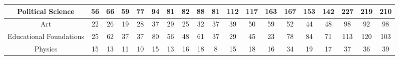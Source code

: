 \documentclass[10]{article}
\begin{document}
\begin{landscape}
\begin{longtable}[c]{|ccccccccccccccccccc|}
	\multicolumn{1}{|c|}{Political Science}                          & \multicolumn{1}{c|}{56}         & \multicolumn{1}{c|}{66}         & \multicolumn{1}{c|}{59}         & \multicolumn{1}{c|}{77}         & \multicolumn{1}{c|}{94}         & \multicolumn{1}{c|}{81}         & \multicolumn{1}{c|}{82}         & \multicolumn{1}{c|}{88}         & \multicolumn{1}{c|}{81}         & \multicolumn{1}{c|}{112}        & \multicolumn{1}{c|}{117}        & \multicolumn{1}{c|}{163}        & \multicolumn{1}{c|}{167}        & \multicolumn{1}{c|}{153}        & \multicolumn{1}{c|}{142}        & \multicolumn{1}{c|}{227}        & \multicolumn{1}{c|}{219}        & 210        \\ \hline
	\multicolumn{1}{|c|}{Art}                                        & \multicolumn{1}{c|}{22}         & \multicolumn{1}{c|}{26}         & \multicolumn{1}{c|}{19}         & \multicolumn{1}{c|}{28}         & \multicolumn{1}{c|}{37}         & \multicolumn{1}{c|}{29}         & \multicolumn{1}{c|}{25}         & \multicolumn{1}{c|}{32}         & \multicolumn{1}{c|}{37}         & \multicolumn{1}{c|}{39}         & \multicolumn{1}{c|}{50}         & \multicolumn{1}{c|}{59}         & \multicolumn{1}{c|}{52}         & \multicolumn{1}{c|}{44}         & \multicolumn{1}{c|}{48}         & \multicolumn{1}{c|}{98}         & \multicolumn{1}{c|}{92}         & 98         \\ \hline
	\multicolumn{1}{|c|}{Educational Foundations}                    & \multicolumn{1}{c|}{25}         & \multicolumn{1}{c|}{62}         & \multicolumn{1}{c|}{37}         & \multicolumn{1}{c|}{37}         & \multicolumn{1}{c|}{80}         & \multicolumn{1}{c|}{56}         & \multicolumn{1}{c|}{48}         & \multicolumn{1}{c|}{61}         & \multicolumn{1}{c|}{37}         & \multicolumn{1}{c|}{29}         & \multicolumn{1}{c|}{45}         & \multicolumn{1}{c|}{23}         & \multicolumn{1}{c|}{78}         & \multicolumn{1}{c|}{84}         & \multicolumn{1}{c|}{71}         & \multicolumn{1}{c|}{113}        & \multicolumn{1}{c|}{120}        & 103        \\ \hline
	\multicolumn{1}{|c|}{Physics}                                    & \multicolumn{1}{c|}{15}         & \multicolumn{1}{c|}{13}         & \multicolumn{1}{c|}{11}         & \multicolumn{1}{c|}{10}         & \multicolumn{1}{c|}{15}         & \multicolumn{1}{c|}{13}         & \multicolumn{1}{c|}{16}         & \multicolumn{1}{c|}{18}         & \multicolumn{1}{c|}{8}          & \multicolumn{1}{c|}{15}         & \multicolumn{1}{c|}{18}         & \multicolumn{1}{c|}{16}         & \multicolumn{1}{c|}{34}         & \multicolumn{1}{c|}{19}         & \multicolumn{1}{c|}{17}         & \multicolumn{1}{c|}{37}         & \multicolumn{1}{c|}{36}         & 39         \\ \hline

\end{longtable}
\end{landscape}
\end{document}
